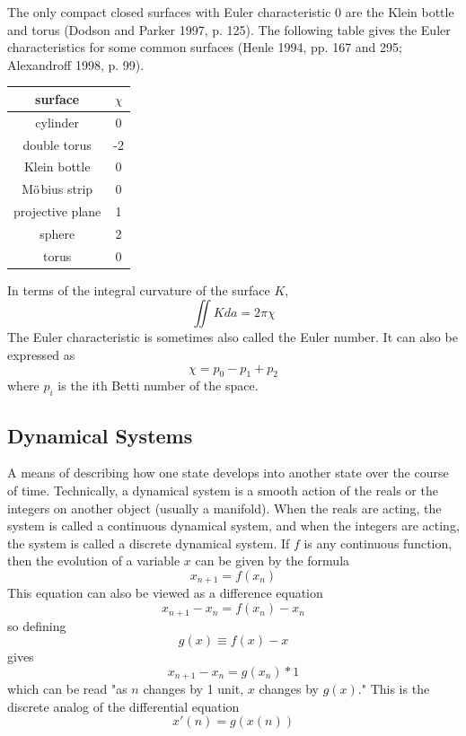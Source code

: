 \documentclass[lang=en,11pt,a4paper,cite=numbers]{elegantpaper}
\begin{document}
  The only compact closed surfaces with Euler characteristic 0 are the Klein bottle and torus (Dodson and Parker 1997, p. 125). The following table gives the Euler characteristics for some common surfaces (Henle 1994, pp. 167 and 295; Alexandroff 1998, p. 99).
\begin{table}[htbp]
  \centering
  \begin{tabular}{c|c}
    \hline
    surface & $\chi$ \\
    \hline
    cylinder & 0 \\
    double torus & -2 \\
    Klein bottle & 0 \\
    M$\rm{\ddot{o}}$bius strip & 0 \\
    projective plane & 1 \\
    sphere & 2 \\
    torus & 0 \\
    \hline
  \end{tabular}
\end{table}

  In terms of the integral curvature of the surface $K$,
\begin{equation}
  {\iint}Kda=2{\pi}{\chi}
\end{equation}
The Euler characteristic is sometimes also called the Euler number. It can also be expressed as
\begin{equation}
  {\chi}=p_{0}-p_{1}+p_{2}
\end{equation}
where $p_i$ is the ith Betti number of the space.

\subsection{Dynamical Systems\cite{dynamical-systems}}
\label{terms:torus-dynamical-systems}
  A means of describing how one state develops into another state over the course of time. Technically, a dynamical system is a smooth action of the reals or the integers on another object (usually a manifold). When the reals are acting, the system is called a continuous dynamical system, and when the integers are acting, the system is called a discrete dynamical system. If $f$ is any continuous function, then the evolution of a variable $x$ can be given by the formula
\begin{equation}
  x_{n+1}=f(x_{n})
\end{equation}
This equation can also be viewed as a difference equation
\begin{equation}
  x_{n+1}-x_{n}=f(x_{n})-x_{n}
\end{equation}
so defining
\begin{equation}
  g(x){\equiv}f(x)-x
\end{equation}
gives
\begin{equation}
  x_{n+1}-x_{n}=g(x_{n})*1
\end{equation}
which can be read "as $n$ changes by 1 unit, $x$ changes by $g(x)$." This is the discrete analog of the differential equation
\begin{equation}
  x'(n)=g(x(n))
\end{equation}


\end{document}
